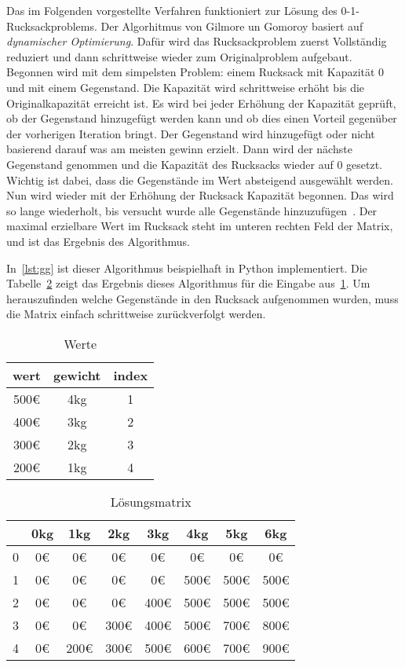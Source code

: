 \documentclass[12pt, a4paper, ngerman]{article}
\begin{document}
Das im Folgenden vorgestellte Verfahren funktioniert zur Lösung des 0-1-Rucksackproblems.
Der Algorhitmus von Gilmore un Gomoroy basiert auf \emph{dynamischer Optimierung}.
Dafür wird das Rucksackproblem zuerst Vollständig reduziert
und dann schrittweise wieder zum Originalproblem aufgebaut.
Begonnen wird mit dem simpelsten Problem: einem Rucksack mit Kapazität 0 und mit einem Gegenstand.
Die Kapazität wird schrittweise erhöht bis die Originalkapazität erreicht ist.
Es wird bei jeder Erhöhung der Kapazität geprüft, ob der Gegenstand hinzugefügt werden kann
und ob dies einen Vorteil gegenüber der vorherigen Iteration bringt.
Der Gegenstand wird hinzugefügt oder nicht basierend darauf was am meisten gewinn erzielt.
Dann wird der nächste Gegenstand genommen und die Kapazität des Rucksacks wieder auf 0 gesetzt.
Wichtig ist dabei, dass die Gegenstände im Wert absteigend ausgewählt werden.
Nun wird wieder mit der Erhöhung der Rucksack Kapazität begonnen.
Das wird so lange wiederholt, bis versucht wurde alle Gegenstände hinzuzufügen~\cite{scheiterhauer2008}.
Der maximal erzielbare Wert im Rucksack steht im unteren rechten Feld der Matrix,
und ist das Ergebnis des Algorithmus.

In~\ref{lst:gg} ist dieser Algorithmus beispielhaft in Python implementiert.
Die Tabelle~\ref{table:2} zeigt das Ergebnis dieses Algorithmus für die Eingabe aus~\ref{table:1}.
Um herauszufinden welche Gegenstände in den Rucksack aufgenommen wurden,
muss die Matrix einfach schrittweise zurückverfolgt werden.

\begin{table}
  \renewcommand{\arraystretch}{1.2}
  \centering
  \begin{tabular}{c|c|c}
    wert & gewicht & index \\
    \hline
    500€ & 4kg     & 1     \\
    400€ & 3kg     & 2     \\
    300€ & 2kg     & 3     \\
    200€ & 1kg     & 4
  \end{tabular}
  \caption{Werte}
  \label{table:1}
\end{table}

\begin{table}
  \renewcommand{\arraystretch}{1.2}
  \centering
  \begin{tabular}{c |c c c c c c c}
      & 0kg & 1kg  & 2kg  & 3kg  & 4kg  & 5kg  & 6kg  \\
    \hline
    0 & 0€  & 0€   & 0€   & 0€   & 0€   & 0€   & 0€   \\
    1 & 0€  & 0€   & 0€   & 0€   & 500€ & 500€ & 500€ \\
    2 & 0€  & 0€   & 0€   & 400€ & 500€ & 500€ & 500€ \\
    3 & 0€  & 0€   & 300€ & 400€ & 500€ & 700€ & 800€ \\
    4 & 0€  & 200€ & 300€ & 500€ & 600€ & 700€ & 900€
  \end{tabular}
  \caption{Lösungsmatrix}
  \label{table:2}
\end{table}
\end{document}
